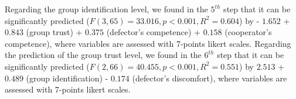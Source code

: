 Regarding the group identification level, %
we found in the $5^{th}$ step that it can be significantly predicted ($F(3,65)=33.016, p<0.001, R^2=0.604$) by - $1.652$ + $0.843$ (group trust) + $0.375$ (defector's competence) + $0.158$ (cooperator's competence), where variables are assessed with 7-points likert scales. %
Regarding the prediction of the group trust level, %
we found in the $6^{th}$ step that it can be significantly predicted ($F(2,66)=40.455, p<0.001, R^2=0.551$) by $2.513$ + $0.489$ (group identification) - $0.174$ (defector's discomfort), where variables are assessed with 7-points likert scales. %

